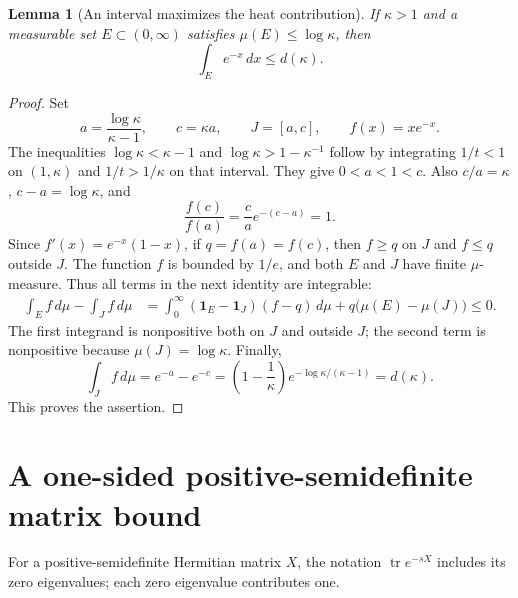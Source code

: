 \documentclass[11pt]{article}
\newtheorem{lemma}{Lemma}
\newcommand{\tr}{\operatorname{tr}}
\begin{document}
\begin{lemma}[An interval maximizes the heat contribution]\label{lem:scalar}
If $\kappa>1$ and a measurable set $E\subset(0,\infty)$ satisfies
$\mu(E)\leq\log\kappa$, then
\begin{equation}\label{eq:integral-bound}
 \int_E e^{-x}\,dx\leq d(\kappa).
\end{equation}
\end{lemma}
\begin{proof}
Set
\[
 a=\frac{\log\kappa}{\kappa-1},\qquad
 c=\kappa a,\qquad J=[a,c],\qquad f(x)=xe^{-x}.
\]
The inequalities
$\log\kappa<\kappa-1$ and
$\log\kappa>1-\kappa^{-1}$ follow by integrating $1/t<1$
on $(1,\kappa)$ and $1/t>1/\kappa$ on that interval.
They give $0<a<1<c$. Also $c/a=\kappa$,
$c-a=\log\kappa$, and
\[
 \frac{f(c)}{f(a)}=\frac ca e^{-(c-a)}=1.
\]
Since $f'(x)=e^{-x}(1-x)$, if $q=f(a)=f(c)$, then
$f\geq q$ on $J$ and $f\leq q$ outside $J$.
The function $f$ is bounded by $1/e$, and both $E$ and $J$ have
finite $\mu$-measure. Thus all terms in the next identity are integrable:
\begin{align*}
 \int_E f\,d\mu-\int_J f\,d\mu
 &=\int_0^\infty(\mathbf1_E-\mathbf1_J)(f-q)\,d\mu
       +q\bigl(\mu(E)-\mu(J)\bigr)\leq0.
\end{align*}
The first integrand is nonpositive both on $J$ and outside $J$;
the second term is nonpositive because $\mu(J)=\log\kappa$.
Finally,
\[
 \int_J f\,d\mu=e^{-a}-e^{-c}
  =\left(1-\frac1\kappa\right)e^{-\log\kappa/(\kappa-1)}
  =d(\kappa).
\]
This proves the assertion.
\end{proof}

\section{A one-sided positive-semidefinite matrix bound}
For a positive-semidefinite Hermitian matrix $X$, the notation
$\tr e^{-sX}$ includes its zero eigenvalues; each zero eigenvalue
contributes one.
\end{document}
